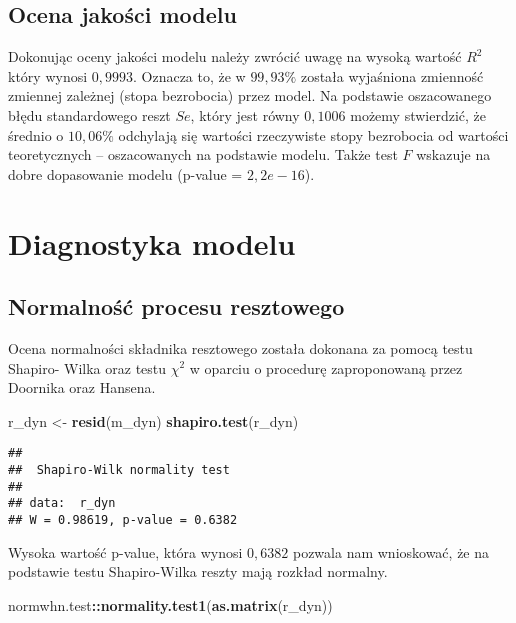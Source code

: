 \documentclass[polish,]{book}
\newenvironment{Shaded}{\begin{snugshade}}{\end{snugshade}}
\newcommand{\KeywordTok}[1]{\textcolor[rgb]{0.13,0.29,0.53}{\textbf{#1}}}
\newcommand{\NormalTok}[1]{#1}
\newcommand{\OperatorTok}[1]{\textcolor[rgb]{0.81,0.36,0.00}{\textbf{#1}}}
\newcommand{\StringTok}[1]{\textcolor[rgb]{0.31,0.60,0.02}{#1}}
\begin{document}
\hypertarget{part_10.3.2}{%
\subsection{Ocena jakości modelu}\label{part_10.3.2}}

Dokonując oceny jakości modelu należy zwrócić uwagę na wysoką wartość \(R^2\) który wynosi \(0,9993\). Oznacza to, że w \(99,93\%\) została wyjaśniona zmienność zmiennej
zależnej (stopa bezrobocia) przez model. Na podstawie oszacowanego błędu standardowego reszt \(Se\), który jest równy \(0,1006\) możemy stwierdzić, że średnio o \(10,06\%\)
odchylają się wartości rzeczywiste stopy bezrobocia od wartości teoretycznych -- oszacowanych na podstawie modelu. Także test \(F\) wskazuje na dobre dopasowanie
modelu (p-value = \(2,2e-16\)).

\hypertarget{part_10.4}{%
\section{Diagnostyka modelu}\label{part_10.4}}

\hypertarget{part_10.4.1}{%
\subsection{Normalność procesu resztowego}\label{part_10.4.1}}

Ocena normalności składnika resztowego została dokonana za pomocą testu Shapiro-
Wilka oraz testu \(\chi^2\) w oparciu o procedurę zaproponowaną przez Doornika oraz
Hansena.

\begin{Shaded}
\begin{Highlighting}[]
\NormalTok{r_dyn <-}\StringTok{ }\KeywordTok{resid}\NormalTok{(m_dyn)}
\KeywordTok{shapiro.test}\NormalTok{(r_dyn)}
\end{Highlighting}
\end{Shaded}

\begin{verbatim}
## 
##  Shapiro-Wilk normality test
## 
## data:  r_dyn
## W = 0.98619, p-value = 0.6382
\end{verbatim}

Wysoka wartość p-value, która wynosi \(0,6382\) pozwala nam wnioskować, że na podstawie testu Shapiro-Wilka reszty mają rozkład normalny.

\begin{Shaded}
\begin{Highlighting}[]
\NormalTok{normwhn.test}\OperatorTok{::}\KeywordTok{normality.test1}\NormalTok{(}\KeywordTok{as.matrix}\NormalTok{(r_dyn))}
\end{Highlighting}
\end{Shaded}
\end{document}
